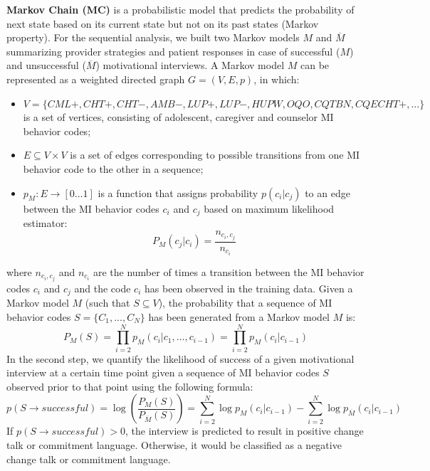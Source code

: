 \documentclass{amia_summit_2018}
\begin{document}
\textbf {Markov Chain (MC)} is a probabilistic model that predicts the probability of next state based on its current state but not on its past states (Markov property). For the sequential analysis, we built two Markov models $M$ and $\overline{M}$ summarizing provider strategies and patient responses in case of successful ($M$) and unsuccessful ($\overline{M}$) motivational interviews. A Markov model $M$ can be represented as a weighted directed graph $G = (V, E, p)$, in which:
\begin{itemize}
\item $V = \{CML+, CHT+, CHT-, AMB-, LUP+, LUP-, HUPW, OQO, CQTBN, CQECHT+,...\}$ is a set of vertices, consisting of adolescent, caregiver and counselor MI behavior codes;
\item $E \subseteq V \times V$ is a set of edges corresponding to possible transitions from one MI behavior code to the other in a sequence;
\item $p_M:E\rightarrow[0...1]$ is a function that assigns probability $p(c_i|c_j)$ to an edge between the MI behavior codes $c_i$ and $c_j$ based on maximum likelihood estimator:
\begin{equation}
P_M(c_j|c_i) = \frac{n_{c_i,c_j}}{n_{c_i}}
\end{equation}
\end{itemize}
where $n_{c_i,c_j}$ and $n_{c_i}$ are the number of times a transition between the MI behavior codes $c_i$ and $c_j$ and the code $c_i$ has been observed in the training data. Given a Markov model $M$ (such that $S\subseteq V$), the probability that a sequence of MI behavior codes $S = \{C_1,...,C_N\}$ has been generated from a Markov model $M$ is:
\begin{equation}
P_M(S) = \prod_{i=2}^N p_M(c_i|c_1,\dots,c_{i-1})=\prod_{i=2}^N p_M(c_i|c_{i-1})
\end{equation}
In the second step, we quantify the likelihood of success of a given motivational interview at a certain time point given a sequence of MI behavior codes $S$ observed prior to that point using the following formula:
\begin{equation}
p(S\rightarrow successful) = \log\left(\frac{P_M(S)}{P_{\overline M}(S)}\right)= \sum_{i=2}^N \log p_M(c_i|c_{i-1})-\sum_{i=2}^N \log p_{\overline M}(c_i|c_{i-1})\label{eq:class}
\end{equation}
If $p(S\rightarrow successful) > 0 $, the interview is predicted to result in positive change talk or commitment language. Otherwise, it would be classified as a negative change talk or commitment language.
\end{document}
